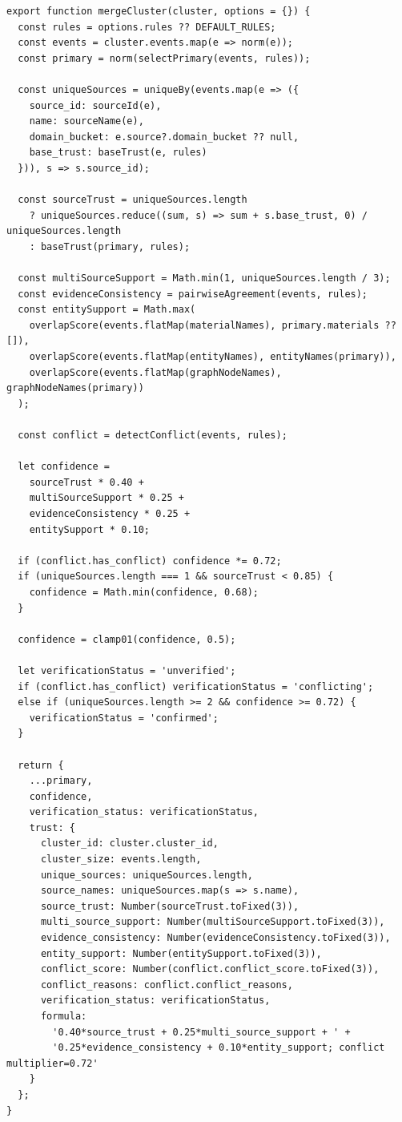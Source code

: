 ﻿\documentclass[12pt,a4paper]{article}
\begin{document}
\begin{lstlisting}[style=projectcode,caption={Trust Graph 事件相似度、聚类与置信度计算}]
export function mergeCluster(cluster, options = {}) {
  const rules = options.rules ?? DEFAULT_RULES;
  const events = cluster.events.map(e => norm(e));
  const primary = norm(selectPrimary(events, rules));

  const uniqueSources = uniqueBy(events.map(e => ({
    source_id: sourceId(e),
    name: sourceName(e),
    domain_bucket: e.source?.domain_bucket ?? null,
    base_trust: baseTrust(e, rules)
  })), s => s.source_id);

  const sourceTrust = uniqueSources.length
    ? uniqueSources.reduce((sum, s) => sum + s.base_trust, 0) / uniqueSources.length
    : baseTrust(primary, rules);

  const multiSourceSupport = Math.min(1, uniqueSources.length / 3);
  const evidenceConsistency = pairwiseAgreement(events, rules);
  const entitySupport = Math.max(
    overlapScore(events.flatMap(materialNames), primary.materials ?? []),
    overlapScore(events.flatMap(entityNames), entityNames(primary)),
    overlapScore(events.flatMap(graphNodeNames), graphNodeNames(primary))
  );

  const conflict = detectConflict(events, rules);

  let confidence =
    sourceTrust * 0.40 +
    multiSourceSupport * 0.25 +
    evidenceConsistency * 0.25 +
    entitySupport * 0.10;

  if (conflict.has_conflict) confidence *= 0.72;
  if (uniqueSources.length === 1 && sourceTrust < 0.85) {
    confidence = Math.min(confidence, 0.68);
  }

  confidence = clamp01(confidence, 0.5);

  let verificationStatus = 'unverified';
  if (conflict.has_conflict) verificationStatus = 'conflicting';
  else if (uniqueSources.length >= 2 && confidence >= 0.72) {
    verificationStatus = 'confirmed';
  }

  return {
    ...primary,
    confidence,
    verification_status: verificationStatus,
    trust: {
      cluster_id: cluster.cluster_id,
      cluster_size: events.length,
      unique_sources: uniqueSources.length,
      source_names: uniqueSources.map(s => s.name),
      source_trust: Number(sourceTrust.toFixed(3)),
      multi_source_support: Number(multiSourceSupport.toFixed(3)),
      evidence_consistency: Number(evidenceConsistency.toFixed(3)),
      entity_support: Number(entitySupport.toFixed(3)),
      conflict_score: Number(conflict.conflict_score.toFixed(3)),
      conflict_reasons: conflict.conflict_reasons,
      verification_status: verificationStatus,
      formula:
        '0.40*source_trust + 0.25*multi_source_support + ' +
        '0.25*evidence_consistency + 0.10*entity_support; conflict multiplier=0.72'
    }
  };
}
\end{lstlisting}
\end{document}
